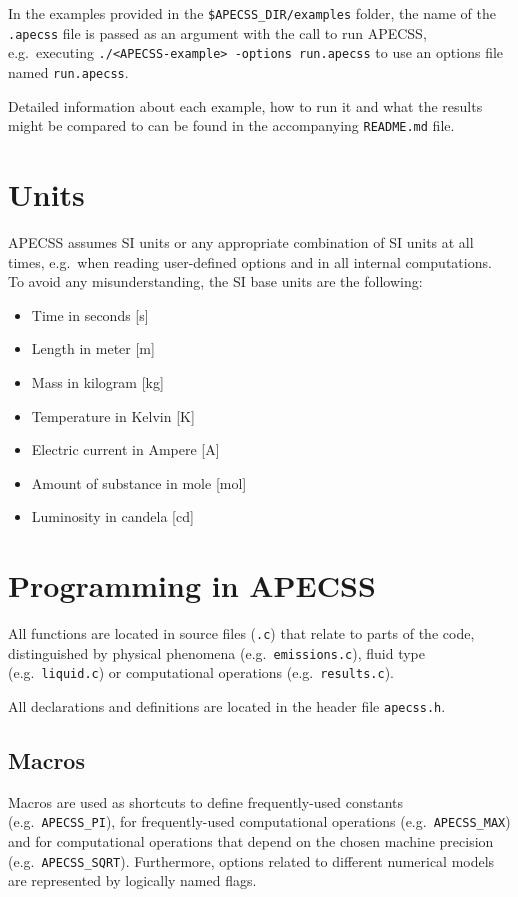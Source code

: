 In the examples provided in the {\tt \$APECSS\_DIR/examples} folder, the name of the  {\tt *.apecss} file is passed as an argument with the call to run APECSS, e.g.~executing {\tt ./<APECSS-example> -options run.apecss} to use an options file named {\tt run.apecss}.

Detailed information about each example, how to run it and what the results might be compared to can be found in the accompanying {\tt README.md} file.

\section{Units}

APECSS assumes SI units or any appropriate combination of SI units at all times, e.g.~when reading user-defined options and in all internal computations. To avoid any misunderstanding, the SI base units are the following:\vspace{-1em}
\begin{itemize}[noitemsep]
  \item Time in seconds [s]
  \item Length in meter [m]
  \item Mass in kilogram [kg]
  \item Temperature in Kelvin [K]
  \item Electric current in Ampere [A] 
  \item Amount of substance in mole [mol]
  \item Luminosity in candela [cd]
\end{itemize}


\section{Programming in APECSS}

All functions are located in source files ({\tt *.c}) that relate to parts of the code, distinguished by physical phenomena (e.g.~{\tt emissions.c}), fluid type (e.g.~{\tt liquid.c}) or computational operations (e.g.~{\tt results.c}). 

All declarations and definitions are located in the header file {\tt apecss.h}. 

\subsection{Macros}

Macros are used as shortcuts to define frequently-used constants (e.g.~{\tt APECSS\_PI}), for frequently-used computational operations (e.g.~{\tt APECSS\_MAX}) and for computational operations that depend on the chosen machine precision (e.g.~{\tt APECSS\_SQRT}). Furthermore, options related to different numerical models are represented by logically named flags.

